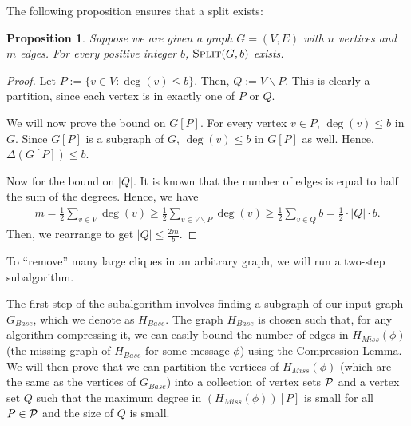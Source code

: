 \documentclass[11pt]{article}
\newtheorem{proposition}[lemma]{Proposition}
\theoremstyle{definition}
\renewcommand{\leq}{\leqslant}
\renewcommand{\geq}{\geqslant}
\renewcommand{\le}{\leq}
\renewcommand{\ge}{\geq}
\begin{document}
\noindent
The following proposition ensures that a split exists:

\begin{proposition}\label{partition-degree-bound}
Suppose we are given a graph $G=(V, E)$ with $n$ vertices and $m$ edges. For every positive integer $b$, $\textnormal{\textsc{Split}}(G, b)$ exists.
\end{proposition}
\begin{proof}
Let $P:=\{v\in V:\deg{(v)}\le b\}$. Then, $Q:=V\backslash P$. This is clearly a partition, since each vertex is in exactly one of $P$ or $Q$. 

We will now prove the bound on $G[P]$. For every vertex $v\in P$, $\deg{(v)}\le b$ in $G$. Since $G[P]$ is a subgraph of $G$, $\deg{(v)}\le b$ in $G[P]$ as well. Hence, $\Delta{(G[P])}\le b$. 

Now for the bound on $|Q|$. It is known that the number of edges is equal to half the sum of the degrees. Hence, we have 
\begin{align*}
    m=\frac12\sum_{v\in V}\deg{(v)}\ge \frac12\sum_{v\in V\backslash P}\deg{(v)}\ge \frac 12\sum_{v\in Q} b=\frac 12\cdot |Q|\cdot b.
\end{align*}
Then, we rearrange to get $|Q|\le \frac{2m}b$. 
\end{proof}

To ``remove'' many large cliques in an arbitrary graph, we will run a two-step subalgorithm. 

The first step of the subalgorithm involves finding a subgraph of our input graph $G_{Base}$, which we denote as $H_{Base}$. The graph $H_{Base}$ is chosen such that, for any algorithm compressing it, we can easily bound the number of edges in $H_{Miss}(\phi)$ (the missing graph of $H_{Base}$ for some message $\phi$) using the \hyperref[compression]{Compression Lemma}. We will then prove that we can partition the vertices of $H_{Miss}(\phi)$ (which are the same as the vertices of $G_{Base}$) into a collection of vertex sets $\mathcal{P}$ and a vertex set $Q$ such that the maximum degree in $\left(H_{Miss}(\phi)\right)[P]$ is small for all $P\in \mathcal{P}$ and the size of $Q$ is small. 
\end{document}
